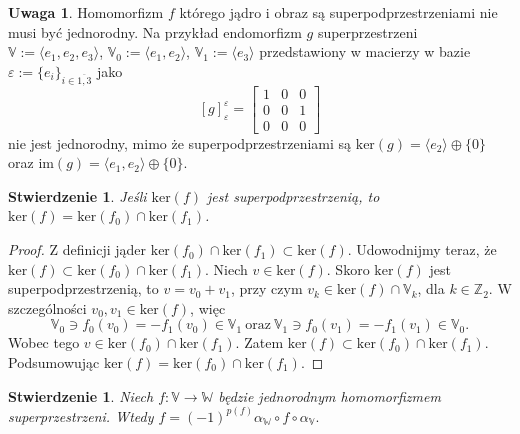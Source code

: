 \documentclass[11pt,a4paper]{report}
\newtheorem{proposition}[theorem]{Stwierdzenie}
\theoremstyle{definition}
\newtheorem{remark}[theorem]{Uwaga}
\newcommand{\eps}{\varepsilon}
\begin{document}
\begin{remark}
 Homomorfizm $f$ którego jądro i obraz są superpodprzestrzeniami nie musi być jednorodny. Na przykład endomorfizm $g$ superprzestrzeni $\mathbb{V} := \langle e_1, e_2, e_3 \rangle$, $\mathbb{V}_0 := \langle e_1, e_2 \rangle$, $\mathbb{V}_1 := \langle e_3 \rangle$ przedstawiony w macierzy w bazie $\eps:=\{ e_i \}_{i \in \overline{1,3}}$ jako 
 $$[g]^\eps_\eps = \begin{bmatrix}
      1 & 0 & 0 \\
      0 & 0 & 1 \\
      0 & 0 & 0 
     \end{bmatrix}$$
 nie jest jednorodny, mimo że superpodprzestrzeniami są $\textrm{ker}(g) = \langle e_2\rangle \oplus \{ 0 \}$ oraz $\textrm{im}(g) = \langle e_1, e_2 \rangle \oplus \{ 0 \}.$
\end{remark}

\begin{proposition}
 Jeśli $\mathrm{ker}(f)$ jest superpodprzestrzenią, to $\mathrm{ker}(f) = \mathrm{ker}(f_0) \cap \mathrm{ker}(f_1)$.
\end{proposition}

\begin{proof}
 Z definicji jąder $\mathrm{ker}(f_0) \cap \mathrm{ker}(f_1) \subset \mathrm{ker}(f).$ Udowodnijmy teraz, że $\mathrm{ker}(f) \subset \mathrm{ker}(f_0) \cap \mathrm{ker}(f_1).$ Niech $v \in \mathrm{ker}(f)$. Skoro $\mathrm{ker}(f)$ jest superpodprzestrzenią, to $v = v_0 + v_1$, przy czym $v_k \in \mathrm{ker}(f) \cap \mathbb{V}_k$, dla $k \in \mathbb{Z}_2.$ W szczególności $v_0, v_1 \in \mathrm{ker}(f)$, więc 
 \begin{equation*}
 \mathbb{V}_0 \ni f_0(v_0) =- f_1(v_0) \in \mathbb{V}_1\ \mathrm{oraz}\ \mathbb{V}_1 \ni f_0(v_1) =- f_1(v_1) \in \mathbb{V}_0.
 \end{equation*}
Wobec tego $v \in \mathrm{ker}(f_0) \cap \mathrm{ker}(f_1).$ Zatem $\mathrm{ker}(f) \subset \mathrm{ker}(f_0) \cap \mathrm{ker}(f_1).$ Podsumowując $\mathrm{ker}(f) = \mathrm{ker}(f_0) \cap \mathrm{ker}(f_1)$.
\end{proof}

\begin{proposition}
 Niech $f:\mathbb{V} \rightarrow \mathbb{W}$ będzie jednorodnym homomorfizmem superprzestrzeni. Wtedy $f = (-1)^{p(f)} \alpha_\mathbb{W} \!\circ\! f \!\circ\! \alpha_\mathbb{V}.$
\end{proposition}
\end{document}
